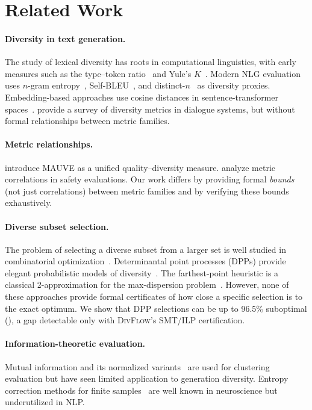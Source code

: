 \documentclass[11pt,a4paper]{article}
\newcommand{\divflow}{\textsc{DivFlow}}
\begin{document}
\section{Related Work}\label{sec:related}

\paragraph{Diversity in text generation.}
The study of lexical diversity has roots in computational
linguistics, with early measures such as the type--token
ratio~\citep{templin1957certain} and Yule's
$K$~\citep{yule1944statistical}.  Modern NLG evaluation
uses $n$-gram entropy~\citep{zhang2018generating},
Self-BLEU~\citep{zhu2018texygen}, and
distinct-$n$~\citep{li2016diversity} as diversity proxies.
Embedding-based approaches use cosine distances in
sentence-transformer spaces~\citep{reimers2019sentence}.
\citet{tevet2021evaluating} provide a survey of diversity
metrics in dialogue systems, but without formal relationships
between metric families.

\paragraph{Metric relationships.}
\citet{pillutla2021mauve} introduce MAUVE as a unified
quality--diversity measure.  \citet{kirk2023understanding}
analyze metric correlations in safety evaluations.
Our work differs by providing formal \emph{bounds}
(not just correlations) between metric families and by
verifying these bounds exhaustively.

\paragraph{Diverse subset selection.}
The problem of selecting a diverse subset from a larger
set is well studied in combinatorial
optimization~\citep{nemhauser1978analysis}.
Determinantal point processes (DPPs) provide elegant
probabilistic models of
diversity~\citep{kulesza2012determinantal}.
The farthest-point heuristic is a classical
2-approximation for the max-dispersion
problem~\citep{ravi1994heuristic}.  However, none of
these approaches provide formal certificates of how
close a specific selection is to the exact optimum.
We show that DPP selections can be up to 96.5\%
suboptimal (), a gap detectable
only with \divflow{}'s SMT/ILP certification.

\paragraph{Information-theoretic evaluation.}
Mutual information and its normalized
variants~\citep{vinh2010information} are used for
clustering evaluation but have seen limited application
to generation diversity.  Entropy correction methods
for finite samples~\citep{miller1955note,
paninski2003estimation} are well known in neuroscience
but underutilized in NLP.
\end{document}
